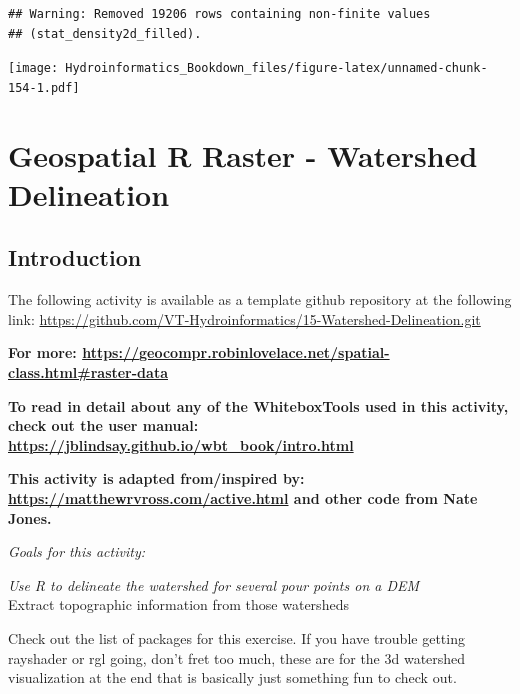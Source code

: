 \documentclass[
]{book}
\newenvironment{Shaded}{\begin{snugshade}}{\end{snugshade}}
\newcommand{\AttributeTok}[1]{\textcolor[rgb]{0.77,0.63,0.00}{#1}}
\newcommand{\CommentTok}[1]{\textcolor[rgb]{0.56,0.35,0.01}{\textit{#1}}}
\newcommand{\FunctionTok}[1]{\textcolor[rgb]{0.00,0.00,0.00}{#1}}
\newcommand{\NormalTok}[1]{#1}
\newcommand{\SpecialCharTok}[1]{\textcolor[rgb]{0.00,0.00,0.00}{#1}}
\begin{document}
\begin{verbatim}
## Warning: Removed 19206 rows containing non-finite values
## (stat_density2d_filled).
\end{verbatim}

\texttt{[image: Hydroinformatics\_Bookdown\_files/figure-latex/unnamed-chunk-154-1.pdf]}

\hypertarget{rgeowatersheds}{%
\chapter{Geospatial R Raster - Watershed Delineation}\label{rgeowatersheds}}

\hypertarget{introduction-3}{%
\section{Introduction}\label{introduction-3}}

The following activity is available as a template github repository at the following link: \url{https://github.com/VT-Hydroinformatics/15-Watershed-Delineation.git}

\textbf{For more: \url{https://geocompr.robinlovelace.net/spatial-class.html\#raster-data}}

\textbf{To read in detail about any of the WhiteboxTools used in this activity, check out the user manual: \url{https://jblindsay.github.io/wbt_book/intro.html}}

\textbf{This activity is adapted from/inspired by: \url{https://matthewrvross.com/active.html} and other code from Nate Jones.}

\emph{Goals for this activity:}

\emph{Use R to delineate the watershed for several pour points on a DEM\\
}Extract topographic information from those watersheds

Check out the list of packages for this exercise. If you have trouble getting rayshader or rgl going, don't fret too much, these are for the 3d watershed visualization at the end that is basically just something fun to check out.

\begin{Shaded}
\end{Shaded}
\end{document}
